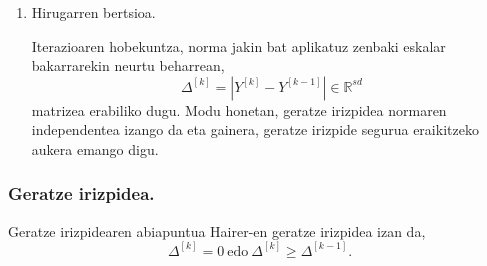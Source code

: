 \begin{enumerate}
\item Hirugarren bertsioa.

Iterazioaren hobekuntza, norma jakin bat aplikatuz zenbaki eskalar bakarrarekin neurtu beharrean,
\begin{equation}
\label{eq:DD3}
\Delta^{[k]}=|Y^{[k]}-Y^{[k-1]}| \in \mathbb{R}^{sd}
\end{equation}
matrizea erabiliko dugu. Modu honetan, geratze irizpidea normaren independentea izango da eta gainera, geratze irizpide segurua eraikitzeko aukera emango digu.

\end{enumerate} 


\subsubsection*{Geratze irizpidea.}

Geratze irizpidearen abiapuntua Hairer-en geratze irizpidea izan da,
\begin{equation*}
\Delta ^{[k]}=0 \ \text{edo} \ \Delta^{[k]} \geqslant \Delta^{[k-1]}.
\end{equation*}

